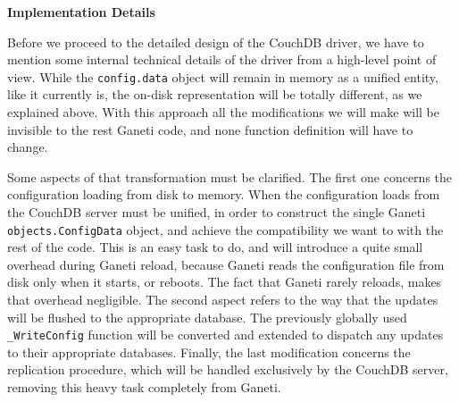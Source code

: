 \begin{description}
    \textbf{Implementation Details}\label{sec:couch_details}

    Before we proceed to the detailed design of the CouchDB driver, we have to
    mention some internal technical details of the driver from a high-level
    point of view. While the \texttt{config.data} object will remain in memory
    as a unified entity, like it currently is, the on-disk representation will
    be totally different, as we explained above. With this approach all the
    modifications we will make will be invisible to the rest Ganeti code, and
    none function definition will have to change.

    Some aspects of that transformation must be clarified. The first one concerns
    the configuration loading from disk to memory. When the configuration loads
    from the CouchDB server must be unified, in order to construct the single
    Ganeti \texttt{objects.ConfigData} object, and achieve the compatibility we
    want to with the rest of the code. This is an easy task to do, and will
    introduce a quite small overhead during Ganeti reload, because Ganeti reads
    the configuration file from disk only when it starts, or reboots. The fact
    that Ganeti rarely reloads, makes that overhead negligible. The second
    aspect refers to the way that the updates will be flushed to the
    appropriate database. The previously globally used \texttt{\_WriteConfig}
    function will be converted and extended to dispatch any updates to their
    appropriate databases. Finally, the last modification concerns the
    replication procedure, which will be handled exclusively by the CouchDB
    server, removing this heavy task completely from Ganeti.


\end{description}
